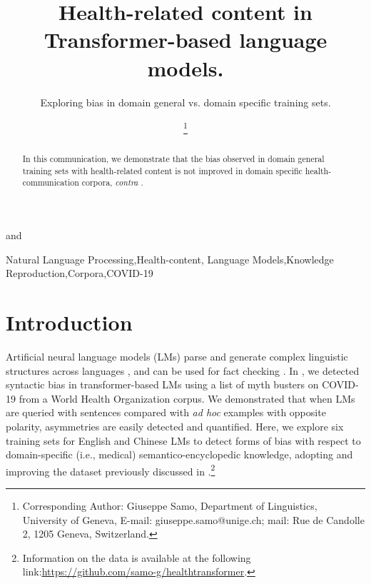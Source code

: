 \documentclass{IOS-Book-Article}
\def\hb{\hbox to 11.5 cm{}}
\begin{document}
\pagestyle{headings}
\def\thepage{}
\begin{frontmatter}              %


\title{Health-related content in Transformer-based language models.}

\markboth{}{January 2023\hb}
\subtitle{Exploring bias in domain general vs. domain specific training sets.}

\vspace{-4mm}
\author[A]{ %
}
and
\author[B]{ 
\thanks{Corresponding Author: Giuseppe Samo, Department of Linguistics, University of Geneva, E-mail: giuseppe.samo@unige.ch; mail: Rue de Candolle 2, 1205 Geneva, Switzerland. }}
\address[A]{University of Cambridge}
\address[B]{University of Geneva}

\begin{abstract}
In this communication, we demonstrate that the bias observed in domain general training sets with health-related content is not improved in domain specific health-communication corpora, \textit{contra} \cite{r1}.
\end{abstract}

\begin{keyword}
Natural Language Processing\sep Health-content\sep 
Language Models\sep Knowledge Reproduction\sep Corpora\sep COVID-19
\end{keyword}
\end{frontmatter}
\markboth{January 2023\hb}{January 2023\hb}

\vspace{-6mm}
\section{Introduction}

Artificial neural language models (LMs) parse and generate complex linguistic structures across languages \cite{r2}, and can be used for fact checking \cite{r3}. 
In \cite{r1}, we detected syntactic bias in transformer-based LMs using a list of myth busters on COVID-19 from a World Health Organization corpus. We demonstrated that when LMs are queried with sentences compared with \textit{ad hoc} examples with opposite polarity, asymmetries are easily detected and quantified.
Here, we explore six training sets for English and Chinese LMs to detect forms of bias with respect to domain-specific (i.e., medical) semantico-encyclopedic knowledge, adopting and improving the dataset previously discussed in \cite{r1}.\footnote{Information on the data is available at the following link:\href{https://github.com/samo-g/healthtransformer}{\underline{https://github.com/samo-g/healthtransformer}}.}
\end{document}
